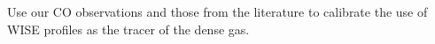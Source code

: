 \documentclass[11pt, preprint]{aastex}
\newcommand{\sers}{{\it S\'{e}rsic}}
\begin{document}
{%


Use our CO observations and those from the literature to calibrate the
use of WISE profiles as the tracer of the dense gas.  



\vspace*{-1cm}
}
\end{document}
